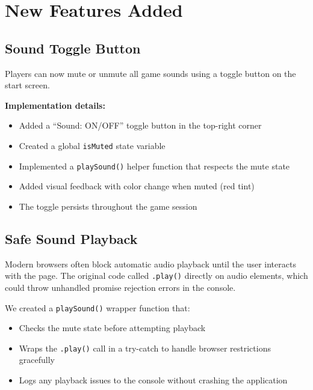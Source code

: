 \documentclass[11pt,a4paper]{article}
\begin{document}
\section{New Features Added}

\subsection{Sound Toggle Button}

Players can now mute or unmute all game sounds using a toggle button on the start screen.

\textbf{Implementation details:}
\begin{itemize}
    \item Added a ``Sound: ON/OFF'' toggle button in the top-right corner
    \item Created a global \texttt{isMuted} state variable
    \item Implemented a \texttt{playSound()} helper function that respects the mute state
    \item Added visual feedback with color change when muted (red tint)
    \item The toggle persists throughout the game session
\end{itemize}

\subsection{Safe Sound Playback}

\begin{issuebox}
Modern browsers often block automatic audio playback until the user interacts with the page. The original code called \texttt{.play()} directly on audio elements, which could throw unhandled promise rejection errors in the console.
\end{issuebox}

\begin{fixbox}
We created a \texttt{playSound()} wrapper function that:
\begin{itemize}
    \item Checks the mute state before attempting playback
    \item Wraps the \texttt{.play()} call in a try-catch to handle browser restrictions gracefully
    \item Logs any playback issues to the console without crashing the application
\end{itemize}
\end{fixbox}
\end{document}
